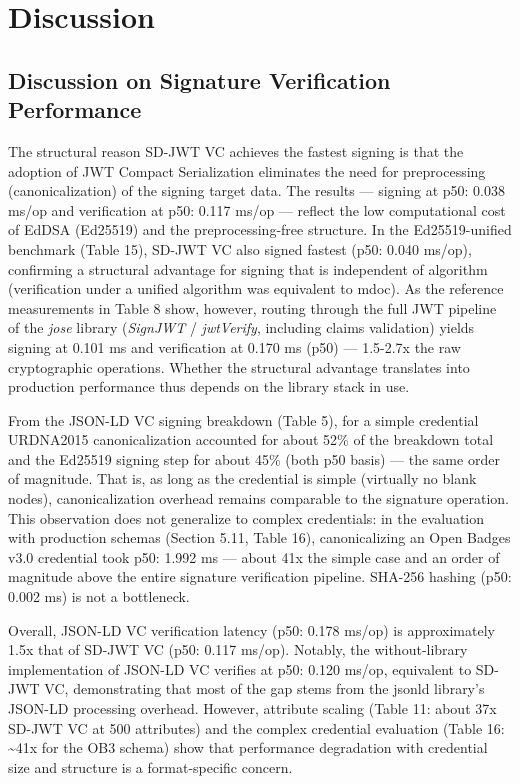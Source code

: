 \documentclass[conference]{IEEEtran}
\begin{document}
\section{Discussion}

\subsection{Discussion on Signature Verification Performance}

The structural reason SD-JWT VC achieves the fastest signing is that the adoption of JWT Compact Serialization eliminates the need for preprocessing (canonicalization) of the signing target data. The results --- signing at p50: 0.038 ms/op and verification at p50: 0.117 ms/op --- reflect the low computational cost of EdDSA (Ed25519) and the preprocessing-free structure. In the Ed25519-unified benchmark (Table 15), SD-JWT VC also signed fastest (p50: 0.040 ms/op), confirming a structural advantage for signing that is independent of algorithm (verification under a unified algorithm was equivalent to mdoc). As the reference measurements in Table 8 show, however, routing through the full JWT pipeline of the \emph{jose} library (\emph{SignJWT} / \emph{jwtVerify}, including claims validation) yields signing at 0.101 ms and verification at 0.170 ms (p50) --- 1.5-2.7x the raw cryptographic operations. Whether the structural advantage translates into production performance thus depends on the library stack in use.

From the JSON-LD VC signing breakdown (Table 5), for a simple credential URDNA2015 canonicalization accounted for about 52\% of the breakdown total and the Ed25519 signing step for about 45\% (both p50 basis) --- the same order of magnitude. That is, as long as the credential is simple (virtually no blank nodes), canonicalization overhead remains comparable to the signature operation. This observation does not generalize to complex credentials: in the evaluation with production schemas (Section 5.11, Table 16), canonicalizing an Open Badges v3.0 credential took p50: 1.992 ms --- about 41x the simple case and an order of magnitude above the entire signature verification pipeline. SHA-256 hashing (p50: 0.002 ms) is not a bottleneck.

Overall, JSON-LD VC verification latency (p50: 0.178 ms/op) is approximately 1.5x that of SD-JWT VC (p50: 0.117 ms/op). Notably, the without-library implementation of JSON-LD VC verifies at p50: 0.120 ms/op, equivalent to SD-JWT VC, demonstrating that most of the gap stems from the jsonld library's JSON-LD processing overhead. However, attribute scaling (Table 11: about 37x SD-JWT VC at 500 attributes) and the complex credential evaluation (Table 16: \textasciitilde41x for the OB3 schema) show that performance degradation with credential size and structure is a format-specific concern.
\end{document}
